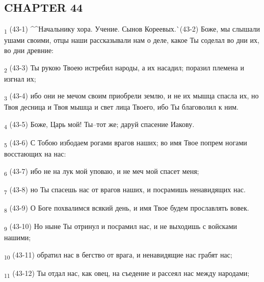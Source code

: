 \subsection{CHAPTER 44}
\begin{tcolorbox}
\textsubscript{1} (43-1) ^^Начальнику хора. Учение. Сынов Кореевых.^^ (43-2) Боже, мы слышали ушами своими, отцы наши рассказывали нам о деле, какое Ты соделал во дни их, во дни древние:
\end{tcolorbox}
\begin{tcolorbox}
\textsubscript{2} (43-3) Ты рукою Твоею истребил народы, а их насадил; поразил племена и изгнал их;
\end{tcolorbox}
\begin{tcolorbox}
\textsubscript{3} (43-4) ибо они не мечом своим приобрели землю, и не их мышца спасла их, но Твоя десница и Твоя мышца и свет лица Твоего, ибо Ты благоволил к ним.
\end{tcolorbox}
\begin{tcolorbox}
\textsubscript{4} (43-5) Боже, Царь мой! Ты--тот же; даруй спасение Иакову.
\end{tcolorbox}
\begin{tcolorbox}
\textsubscript{5} (43-6) С Тобою избодаем рогами врагов наших; во имя Твое попрем ногами восстающих на нас:
\end{tcolorbox}
\begin{tcolorbox}
\textsubscript{6} (43-7) ибо не на лук мой уповаю, и не меч мой спасет меня;
\end{tcolorbox}
\begin{tcolorbox}
\textsubscript{7} (43-8) но Ты спасешь нас от врагов наших, и посрамишь ненавидящих нас.
\end{tcolorbox}
\begin{tcolorbox}
\textsubscript{8} (43-9) О Боге похвалимся всякий день, и имя Твое будем прославлять вовек.
\end{tcolorbox}
\begin{tcolorbox}
\textsubscript{9} (43-10) Но ныне Ты отринул и посрамил нас, и не выходишь с войсками нашими;
\end{tcolorbox}
\begin{tcolorbox}
\textsubscript{10} (43-11) обратил нас в бегство от врага, и ненавидящие нас грабят нас;
\end{tcolorbox}
\begin{tcolorbox}
\textsubscript{11} (43-12) Ты отдал нас, как овец, на съедение и рассеял нас между народами;
\end{tcolorbox}
